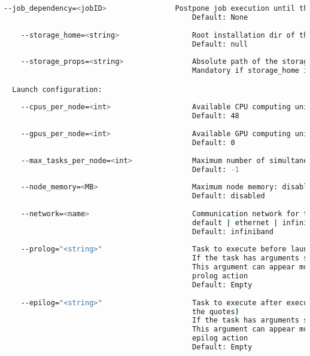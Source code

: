 \begin{lstlisting}[language=bash]
    --job_dependency=<jobID>                Postpone job execution until the job dependency has ended.
                                            Default: None
                                            
    --storage_home=<string>                 Root installation dir of the storage implementation
                                            Default: null
                                            
    --storage_props=<string>                Absolute path of the storage properties file
                                            Mandatory if storage_home is defined

  Launch configuration:
  
    --cpus_per_node=<int>                   Available CPU computing units on each node
                                            Default: 48
                                            
    --gpus_per_node=<int>                   Available GPU computing units on each node
                                            Default: 0
                                            
    --max_tasks_per_node=<int>              Maximum number of simultaneous tasks running on a node
                                            Default: -1
                                            
    --node_memory=<MB>                      Maximum node memory: disabled | <int> (MB)
                                            Default: disabled
                                            
    --network=<name>                        Communication network for transfers: 
                                            default | ethernet | infiniband | data.
                                            Default: infiniband
                                              
    --prolog="<string>"                     Task to execute before launching COMPSs (Notice the quotes)
                                            If the task has arguments split them by "," rather than spaces.
                                            This argument can appear multiple times for more than one
                                            prolog action
                                            Default: Empty
                                            
    --epilog="<string>"                     Task to execute after executing the COMPSs application (Notice
                                            the quotes)
                                            If the task has arguments split them by "," rather than spaces.
                                            This argument can appear multiple times for more than one
                                            epilog action
                                            Default: Empty


\end{lstlisting}
